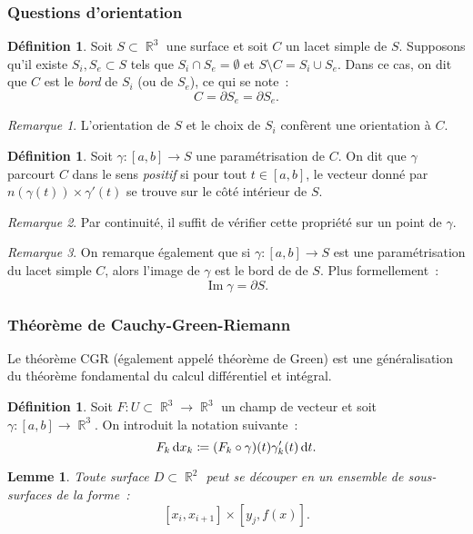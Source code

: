 \documentclass{article}
\DeclareMathOperator{\Imf}{Im}
\DeclareMathOperator{\R}{\mathbb R}
\newtheorem{lem}[thm]{Lemme}
\theoremstyle{definition}
\newtheorem{déf}[thm]{Définition}
\theoremstyle{remark}
\newtheorem*{rmq}{Remarque}
\begin{document}
		\subsubsection{Questions d'orientation}
		\begin{déf} Soit $S \subset \R^3$ une surface et soit $C$ un lacet simple de $S$. Supposons qu'il existe $S_i, S_e \subset S$ tels que
		$S_i \cap S_e = \emptyset$ et $S \setminus C = S_i \cup S_e$. Dans ce cas, on dit que $C$ est le \emph{bord} de $S_i$ (ou de $S_e$), ce qui se note~:
		\[C = \partial S_e = \partial S_e.\]
		\end{déf}

		\begin{rmq} L'orientation de $S$ et le choix de $S_i$ confèrent une orientation à $C$. \end{rmq}

		\begin{déf} Soit $\gamma : [a, b]  \to S$ une paramétrisation de $C$. On dit que $\gamma$ parcourt $C$ dans le sens \emph{positif} si pour tout
		$t \in [a, b]$, le vecteur  donné par $n(\gamma(t)) \times \gamma'(t)$ se trouve sur le côté intérieur de $S$.
		\end{déf}

		\begin{rmq} Par continuité, il suffit de vérifier cette propriété sur un point de $\gamma$. \end{rmq}

		\begin{rmq} On remarque également que si $\gamma : [a, b] \to S$ est une paramétrisation du lacet simple $C$, alors l'image de $\gamma$ est le bord de
		de $S$. Plus formellement~:
		\[\Imf \gamma = \partial S.\]
		\end{rmq}

		\subsubsection{Théorème de Cauchy-Green-Riemann}
		Le théorème CGR (également appelé théorème de Green) est une généralisation du théorème fondamental du calcul différentiel et intégral.

		\begin{déf} Soit $F : U \subset \R^3 \to \R^3$ un champ de vecteur et soit $\gamma : [a, b] \to \R^3$. On introduit la notation suivante~:
		\[F_k\dif x_k \coloneqq (F_k \circ \gamma)(t)\gamma_k'(t)\dif t.\]
		\end{déf}

		\begin{lem}\label{lem:décompositionsurfaces} Toute surface $D \subset \R^2$ peut se \emph{découper} en un ensemble de sous-surfaces de la forme~:
		\[[x_i, x_{i+1}] \times [y_j, f(x)].\]
		\end{lem}
\end{document}
